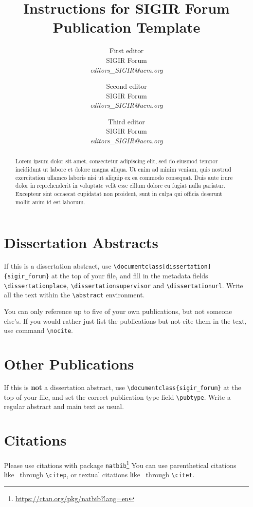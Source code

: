 \documentclass[]{sigir_forum}
\begin{document}
\title{Instructions for SIGIR Forum Publication Template}

\author{
First editor\\SIGIR Forum\\\emph{editors\_SIGIR@acm.org}
\and
Second editor\\SIGIR Forum\\\emph{editors\_SIGIR@acm.org}
\and
Third editor\\SIGIR Forum\\\emph{editors\_SIGIR@acm.org}
}

\maketitle 
\begin{abstract}
Lorem ipsum dolor sit amet, consectetur adipiscing elit, sed do eiusmod tempor incididunt ut labore et dolore magna aliqua. Ut enim ad minim veniam, quis nostrud exercitation ullamco laboris nisi ut aliquip ex ea commodo consequat. Duis aute irure dolor in reprehenderit in voluptate velit esse cillum dolore eu fugiat nulla pariatur. Excepteur sint occaecat cupidatat non proident, sunt in culpa qui officia deserunt mollit anim id est laborum.
\end{abstract}

\section{Dissertation Abstracts}

If this is a dissertation abstract, use \texttt{\textbackslash documentclass[dissertation]\{sigir\_forum\}} at the top of your file, and fill in the metadata fields \texttt{\textbackslash dissertationplace}, \texttt{\textbackslash dissertationsupervisor} and \texttt{\textbackslash dissertationurl}. Write all the text within the \texttt{\textbackslash abstract} environment.

You can only reference up to five of your own publications, but not someone else's. If you would rather just list the publications but not cite them in the text, use command \texttt{\textbackslash nocite}.

\section{Other Publications}

If this is \textbf{not} a dissertation abstract, use \texttt{\textbackslash documentclass\{sigir\_forum\}} at the top of your file, and set the correct publication type field \texttt{\textbackslash pubtype}. Write a regular abstract and main text as usual.

\section{Citations}

Please use citations with package \texttt{natbib}\footnote{\url{https://ctan.org/pkg/natbib?lang=en}}
You can use parenthetical citations like~\citep{forum} through \texttt{\textbackslash citep}, or textual citations like~\citet{forum} through \texttt{\textbackslash citet}.


\end{document}
